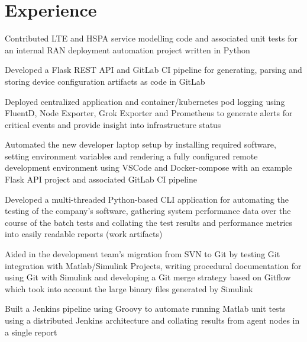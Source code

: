 \documentclass[letterpaper]{deedy-resume} %
\begin{document}
\begin{minipage}[t]{0.66\textwidth} %


\section{Experience}


\vspace{\topsep} %
\begin{tightitemize}
\item Contributed LTE and HSPA service modelling code and associated unit tests for an internal RAN deployment automation project written in Python 
\item Developed a Flask REST API and GitLab CI pipeline for generating, parsing and storing device configuration artifacts as code in GitLab
\item Deployed centralized application and container/kubernetes pod logging using FluentD, Node Exporter, Grok Exporter and Prometheus to generate alerts for critical events and provide insight into infrastructure status
\item Automated the new developer laptop setup by installing required software, setting environment variables and rendering a fully configured remote development environment using VSCode and Docker-compose with an example Flask API project and associated GitLab CI pipeline
\end{tightitemize}

\sectionspace %



\begin{tightitemize}
\item Developed a multi-threaded Python-based CLI application for automating the testing of the company’s software, gathering system performance data over the course of the batch tests and collating the test results and performance metrics into easily readable reports (work artifacts)
\item Aided in the development team’s migration from SVN to Git by testing Git integration with Matlab/Simulink Projects, writing procedural documentation for using Git with Simulink and developing a Git merge strategy based on Gitflow which took into account the large binary files generated by Simulink
\item Built a Jenkins pipeline using Groovy to automate running Matlab unit tests using a distributed Jenkins architecture and collating results from agent nodes in a single report
\end{tightitemize}


\end{minipage}
\end{document}
